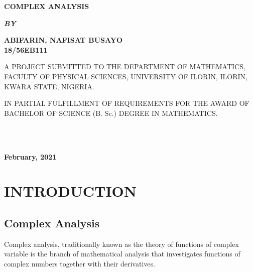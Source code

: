 \documentclass[11pt]{report}
\newcommand{\bt}[1]{\textbf{#1}}
\begin{document}
	
	\begin{center}
		\Large \bt{COMPLEX ANALYSIS}
	\end{center}

	\hspace{7cm}
	
	\begin{center}
		\textbf{\textit{BY}}
	\end{center}
	
	\hspace{5cm}
	
	\begin{center}
		\large \textbf{ABIFARIN, NAFISAT BUSAYO
			\\
			18/56EB111}
	\end{center}
	
	\hspace{9cm}
	
	\begin{center}
		A PROJECT SUBMITTED TO THE DEPARTMENT OF MATHEMATICS, FACULTY OF PHYSICAL SCIENCES, UNIVERSITY OF ILORIN, ILORIN, KWARA STATE, NIGERIA.
	\end{center}

	\hspace{7cm}
	
	\begin{center}
		IN PARTIAL FULFILLMENT OF REQUIREMENTS FOR THE AWARD OF BACHELOR OF SCIENCE (B. Sc.) DEGREE IN MATHEMATICS.
	\end{center}
	\hspace{5cm}
	\\ \\ 
	\begin{center}
		\textbf{February, 2021}
	\end{center}
	
	\newpage
	\tableofcontents
	
	\newpage
	\chapter{INTRODUCTION}
		
	\section{Complex Analysis}
	Complex analysis, traditionally known as the theory of functions of complex variable is the branch of mathematical analysis that investigates functions of complex numbers together with their derivatives.\\
	
\end{document}
